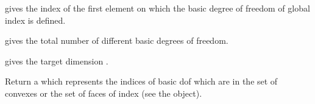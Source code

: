 \documentclass[a4paper,11pt,english]{sphinxmanual}
\begin{document}

\begin{fulllineitems}
\label{\detokenize{userdoc/bfem:_CPPv4N6getfem8mesh_fem25first_convex_of_basic_dofE1j}}%
\pysigstartmultiline
{}%
\pysigstopmultiline
gives the index of the first element on which the basic degree of freedom of
global index  is defined.

\end{fulllineitems}


\begin{fulllineitems}
\label{\detokenize{userdoc/bfem:_CPPv4N6getfem8mesh_fem12nb_basic_dofEv}}%
\pysigstartmultiline
{}%
\pysigstopmultiline
gives the total number of different basic degrees of freedom.

\end{fulllineitems}


\begin{fulllineitems}
\label{\detokenize{userdoc/bfem:_CPPv4N6getfem8mesh_fem8get_qdimEv}}%
\pysigstartmultiline
{}%
\pysigstopmultiline
gives the target dimension .

\end{fulllineitems}


\begin{fulllineitems}
\label{\detokenize{userdoc/bfem:_CPPv4N6getfem8mesh_fem19basic_dof_on_regionE1i}}%
\pysigstartmultiline
{}%
\pysigstopmultiline
Return a  which represents the indices of basic dof which are in the
set of convexes or the set of faces of index  (see the  object).

\end{fulllineitems}
\end{document}
